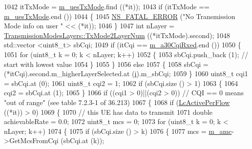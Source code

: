 \begin{DoxyCode}
1042               itTxMode = \hyperlink{classns3_1_1FdMtFfMacScheduler_aabd8cc30ebaf69b99052ddc5c40899e5}{m\_uesTxMode}.find ((*it));
1043               \textcolor{keywordflow}{if} (itTxMode == \hyperlink{classns3_1_1FdMtFfMacScheduler_aabd8cc30ebaf69b99052ddc5c40899e5}{m\_uesTxMode}.end ())
1044                 \{
1045                   \hyperlink{group__fatal_ga5131d5e3f75d7d4cbfd706ac456fdc85}{NS\_FATAL\_ERROR} (\textcolor{stringliteral}{"No Transmission Mode info on user "} << (*it));
1046                 \}
1047               \textcolor{keywordtype}{int} nLayer = \hyperlink{classns3_1_1TransmissionModesLayers_a31f608b7bfaa77440fe4cb85ad035329}{TransmissionModesLayers::TxMode2LayerNum}
       ((*itTxMode).second);
1048               std::vector <uint8\_t> sbCqi;
1049               \textcolor{keywordflow}{if} (itCqi == \hyperlink{classns3_1_1FdMtFfMacScheduler_a21ff76bdadf27aac3b87c43f3bc343c8}{m\_a30CqiRxed}.end ())
1050                 \{
1051                   \textcolor{keywordflow}{for} (uint8\_t k = 0; k < nLayer; k++)
1052                     \{
1053                       sbCqi.push\_back (1);  \textcolor{comment}{// start with lowest value}
1054                     \}
1055                 \}
1056               \textcolor{keywordflow}{else}
1057                 \{
1058                   sbCqi = (*itCqi).second.m\_higherLayerSelected.at (\hyperlink{bernuolliDistribution_8m_a6f6ccfcf58b31cb6412107d9d5281426}{i}).m\_sbCqi;
1059                 \}
1060               uint8\_t cqi1 = sbCqi.at (0);
1061               uint8\_t cqi2 = 1;
1062               \textcolor{keywordflow}{if} (sbCqi.size () > 1)
1063                 \{
1064                   cqi2 = sbCqi.at (1);
1065                 \}
1066               \textcolor{keywordflow}{if} ((cqi1 > 0)||(cqi2 > 0)) \textcolor{comment}{// CQI == 0 means "out of range" (see table 7.2.3-1 of 36.213)}
1067                 \{
1068                   \textcolor{keywordflow}{if} (\hyperlink{classns3_1_1FdMtFfMacScheduler_a18800c37f8a9e4d30d99552d6d6acd15}{LcActivePerFlow} ((*it)) > 0)
1069                     \{
1070                       \textcolor{comment}{// this UE has data to transmit}
1071                       \textcolor{keywordtype}{double} achievableRate = 0.0;
1072                       uint8\_t mcs = 0;
1073                       \textcolor{keywordflow}{for} (uint8\_t k = 0; k < nLayer; k++)
1074                         \{
1075                           \textcolor{keywordflow}{if} (sbCqi.size () > k)
1076                             \{
1077                               mcs = \hyperlink{classns3_1_1FdMtFfMacScheduler_a243eae6fea006597039d90bc727786eb}{m\_amc}->GetMcsFromCqi (sbCqi.at (k));

\end{DoxyCode}

